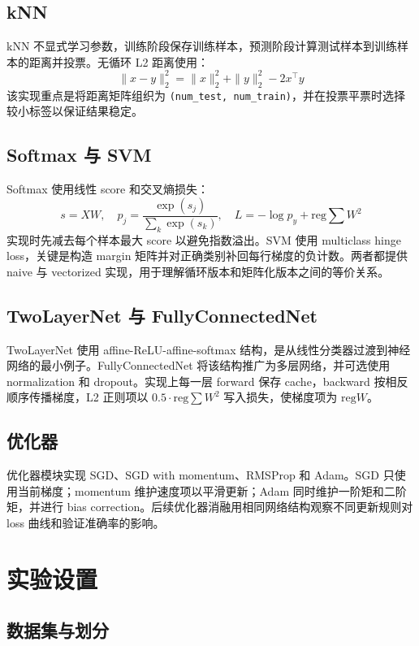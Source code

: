 \documentclass[UTF8]{ctexart}
\begin{document}
\subsection{kNN}

kNN 不显式学习参数，训练阶段保存训练样本，预测阶段计算测试样本到训练样本的距离并投票。无循环 L2 距离使用：
\[
\|x-y\|_2^2=\|x\|_2^2+\|y\|_2^2-2x^\top y
\]
该实现重点是将距离矩阵组织为 \texttt{(num\_test, num\_train)}，并在投票平票时选择较小标签以保证结果稳定。

\subsection{Softmax 与 SVM}

Softmax 使用线性 score 和交叉熵损失：
\[
s = XW,\quad
p_j = \frac{\exp(s_j)}{\sum_k \exp(s_k)},\quad
L = -\log p_y + \mathrm{reg}\sum W^2
\]
实现时先减去每个样本最大 score 以避免指数溢出。SVM 使用 multiclass hinge loss，关键是构造 margin 矩阵并对正确类别补回每行梯度的负计数。两者都提供 naive 与 vectorized 实现，用于理解循环版本和矩阵化版本之间的等价关系。

\subsection{TwoLayerNet 与 FullyConnectedNet}

TwoLayerNet 使用 affine-ReLU-affine-softmax 结构，是从线性分类器过渡到神经网络的最小例子。FullyConnectedNet 将该结构推广为多层网络，并可选使用 normalization 和 dropout。实现上每一层 forward 保存 cache，backward 按相反顺序传播梯度，L2 正则项以 $0.5 \cdot \mathrm{reg}\sum W^2$ 写入损失，使梯度项为 $\mathrm{reg}W$。

\subsection{优化器}

优化器模块实现 SGD、SGD with momentum、RMSProp 和 Adam。SGD 只使用当前梯度；momentum 维护速度项以平滑更新；Adam 同时维护一阶矩和二阶矩，并进行 bias correction。后续优化器消融用相同网络结构观察不同更新规则对 loss 曲线和验证准确率的影响。

\section{实验设置}

\subsection{数据集与划分}
\end{document}
